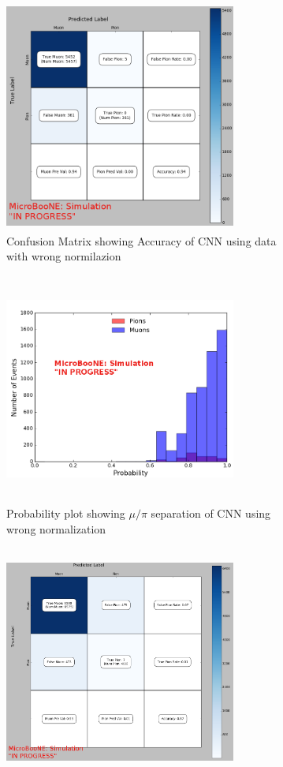 \begin{figure}[htp!]
\centering
	\begin{subfigure}[b]{.45\textwidth}
	\includegraphics[width=3in,height=3in]{figs/confusion_0621_wrongnorm.png}
	\caption{Confusion Matrix showing Accuracy of CNN using data with wrong normilazion}
	\label{fig:confusion_wrongnorm}
	\end{subfigure}
	\quad
	\begin{subfigure}[b]{.45\textwidth}
	\includegraphics[width=3in,height=3in]{figs/prob_0706_wrongnorm_sel1.png}
	\caption{Probability plot showing $\mu/\pi$ separation of CNN using wrong normalization}
	\label{fig:prob_wrongnorm}
	\end{subfigure}
	\quad
	\begin{subfigure}[b]{.45\textwidth}
	\includegraphics[width=3in,height=3in]{figs/confusion_rightnorm_0621.png}

\end{subfigure}
\end{figure}
